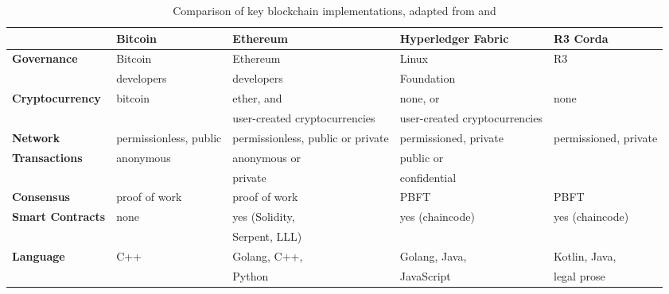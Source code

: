 \begin{table}[!ht]
	\caption{Comparison of key blockchain implementations, adapted from \citet{ibm2018hyperledger} and \citet{valenta2017comparison}}
	\centering
	\label{table:blockchainscomparison}
	\begin{tabularx}{\textwidth}{>{\bfseries}lXXXX}
		\toprule
		                & \textbf{Bitcoin}       & \textbf{Ethereum}                 & \textbf{Hyperledger Fabric}   & \textbf{R3 Corda}     \\
		\midrule
		Governance      & Bitcoin                & Ethereum                          & Linux                         & R3                    \\
		                & developers             & developers                        & Foundation                                            \\
		\midrule
		Cryptocurrency  & bitcoin                & ether, and                        & none, or                      & none                  \\
		                &                        & user-created cryptocurrencies     & user-created cryptocurrencies &                       \\
		\midrule
		Network         & permissionless, public & permissionless, public or private & permissioned, private         & permissioned, private \\
		\midrule
		Transactions    & anonymous              & anonymous or                      & public or                     &                       \\
		                &                        & private                           & confidential                  &                       \\
		\midrule
		Consensus       & proof of work          & proof of work                     & PBFT                          & PBFT                  \\
		\midrule
		Smart Contracts & none                   & yes (Solidity,                    & yes (chaincode)               & yes (chaincode)       \\
		                &                        & Serpent, LLL)                                                                             \\
		\hline
		Language        & C++                    & Golang, C++,                      & Golang, Java,                 & Kotlin, Java,         \\
		                &                        & Python                            & JavaScript                    & legal prose           \\
		\bottomrule
	\end{tabularx}
\end{table}

